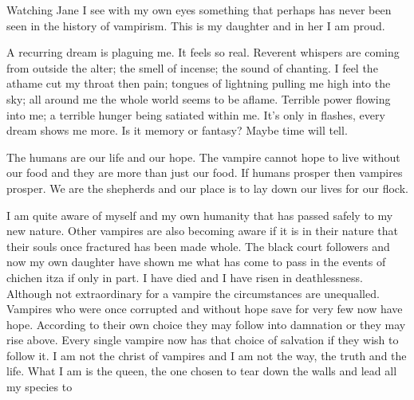 Watching Jane I see with my own eyes something that perhaps has never been seen in the history of vampirism. This is my daughter and in her I am proud.

A recurring dream is plaguing me. It feels so real. Reverent whispers are coming from outside the alter; the smell of incense; the sound of chanting. I feel the athame cut my throat then pain;  tongues of lightning pulling me high into the sky; all around me the whole world seems to be aflame. Terrible power flowing into me; a terrible hunger being satiated within me. It's only in flashes, every dream shows me more. Is it memory or fantasy? Maybe time will tell.


The humans are our life and our hope. The vampire cannot hope to live without our food and they are more than just our food. If humans prosper then vampires prosper. We are the shepherds and our place is to lay down our lives for our flock. 

I am quite aware of myself and my own humanity that has passed safely to my new nature. Other vampires are also becoming aware if it is in their nature that their souls once fractured has been made whole. The black court followers and now my own daughter have shown me what has come to pass in the events of chichen itza if only in part. I have died and I have risen in deathlessness. Although not extraordinary for a vampire the circumstances are unequalled. Vampires who were once corrupted and without hope save for very few now have hope. According to their own choice they may follow into damnation or they may rise above. Every single vampire now has that choice of salvation if they wish to follow it. I am not the christ of vampires and I am not the way, the truth and the life. What I am is the queen, the one chosen to tear down the walls and lead all my species to  
